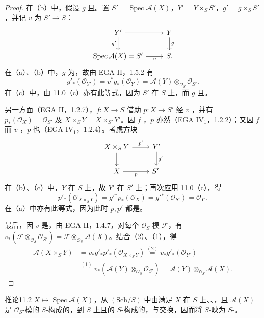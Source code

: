 \begin{proof}
在（b）中，假设 $g$ 且。置 $S'=\operatorname{Spec}\mathcal A(X)$，$Y'=Y\times_S S'$，$g'=g\times_S S'$，并记 $v$ 为 $S'\to S$：
\[
\begin{tikzcd}
Y'\arrow[r]\arrow[d,"g'"']&Y\arrow[d,"g"]\\
\operatorname{Spec}\mathcal A(X)=S'\arrow[r,"v"']&S.
\end{tikzcd}
\]
在（a）、（b）中，$g$ 为，故由 EGA II，1.5.2 有
\[
g'_*(\mathcal O_{Y'})=v^*g_*(\mathcal O_Y)=\mathcal A(Y)\otimes_{\mathcal O_S}\mathcal O_{S'}.\tag{1}
\]
在（c）中，由 11.0（c）亦有此等式，因为 $S'$ 在 $S$ 上，而 $g$ 且。

另一方面（EGA II，1.2.7），$f:X\to S$ 借助 $p:X\to S'$ 经 $v$ ，并有 $p_*(\mathcal O_X)=\mathcal O_{S'}$ 及 $X\times_S Y=X\times_{S'}Y'$。因 $f$ ，$p$ 亦然（EGA IV$_1$，1.2.2）；又因 $f$ 而 $v$ ，$p$ 也（EGA IV$_1$，1.2.4）。考虑方块
\[
\begin{tikzcd}
X\times_S Y\arrow[r,"p'"]\arrow[d]&Y'\arrow[d,"g'"]\\
X\arrow[r,"p"']&S'.
\end{tikzcd}
\]
在（b）、（c）中，$Y$ 在 $S$ 上，故 $Y'$ 在 $S'$ 上；再次应用 11.0（c），得
\[
p'_*(\mathcal O_{X\times_S Y})=g'{}^*p_*(\mathcal O_X)=g'{}^*(\mathcal O_{S'})=\mathcal O_{Y'}.\tag{2}
\]
在（a）中亦有此等式，因为此时 $p,p'$ 都是。

最后，因 $v$ 是，由 EGA II，1.4.7，对每个 $\mathcal O_S$-模 $\mathcal F$，有 $v_*(\mathcal F\otimes_{\mathcal O_S}\mathcal O_{S'})=\mathcal F\otimes_{\mathcal O_S}\mathcal A(X)$。结合（2）、（1），得
\[
\begin{aligned}
\mathcal A(X\times_S Y)
&=v_*g'_*p'_*(\mathcal O_{X\times_S Y})
\overset{(2)}=v_*g'_*(\mathcal O_{Y'})\\
&\overset{(1)}=v_*(\mathcal A(Y)\otimes_{\mathcal O_S}\mathcal O_{S'})
=\mathcal A(Y)\otimes_{\mathcal O_S}\mathcal A(X).
\end{aligned}
\]
\end{proof}
\begin{SGAresult}{推论}{11.2}
 $X\mapsto\operatorname{Spec}\mathcal A(X)$，从 $(\mathrm{Sch}/S)$ 中由满足 $X$ 在 $S$ 上、、，且 $\mathcal A(X)$ 是 $\mathcal O_S$-模的 $S$-构成的，到 $S$ 上且的 $S$-构成的，与交换，因而将 $S$-映为 $S$-。
\end{SGAresult}
